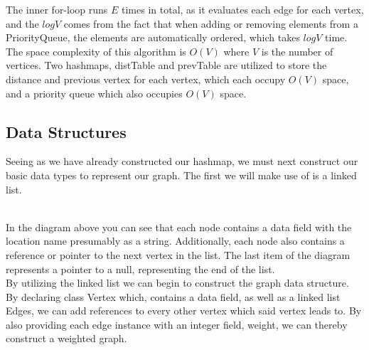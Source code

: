 \documentclass[a4paper]{article}
\begin{document}
The inner for-loop runs $E$ times in total, as it evaluates each edge for each vertex,
and the $logV$ comes from the fact that when adding or removing elements from a PriorityQueue,
the elements are automatically ordered, which takes $logV$ time. \\

The space complexity of this algorithm is $O(V)$ where $V$ is the number of vertices.
Two hashmaps, distTable and prevTable are utilized to store the distance and previous vertex
for each vertex, which each occupy $O(V)$ space,
and a priority queue which also occupies $O(V)$ space.


\subsection{Data Structures}

Seeing as we have already constructed our hashmap, we must next construct our basic data types 
to represent our graph. The first we will make use of is a linked list. \\

 \\


In the diagram above you can see that each node
contains a data field with the location name presumably as a string. 
Additionally, each node also contains a reference or pointer to 
the next vertex in the list. The last item of the diagram represents a pointer to 
a null, representing the end of the list. \\


By utilizing the linked list we can begin to construct the graph data structure.
By declaring class Vertex which, contains a data field, as well as a linked list Edges, 
we can add references to every other vertex which said vertex leads to.
By also providing each edge instance with an integer field, weight,
we can thereby construct a weighted graph.
\end{document}
